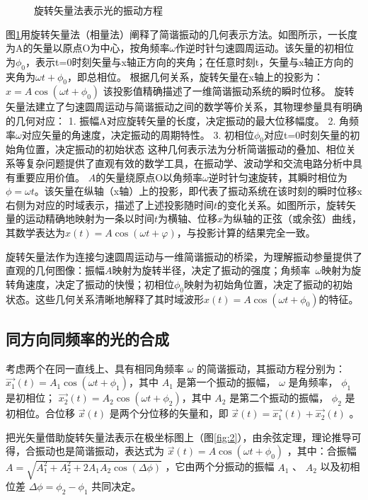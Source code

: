 \documentclass[withoutpreface,bwprint]{cumcmthesis} %
\begin{document}
\begin{appendices}
\begin{figure}[!h]
        \caption{旋转矢量法表示光的振动方程}
        \label{fig:1}
    \end{figure}

    图\ref{fig:1}用旋转矢量法（相量法）阐释了简谐振动的几何表示方法。如图所示，一长度为A的矢量以原点O为中心，按角频率$\omega$作逆时针匀速圆周运动。该矢量的初相位为$\phi_0$，表示t=0时刻矢量与x轴正方向的夹角；在任意时刻t，矢量与x轴正方向的夹角为$\omega t+\phi_0$，即总相位。
    根据几何关系，旋转矢量在x轴上的投影为： $x=A\cos(\omega t+\phi_0)$
    该投影值精确描述了一维简谐振动系统的瞬时位移。
    旋转矢量法建立了匀速圆周运动与简谐振动之间的数学等价关系，其物理参量具有明确的几何对应：
    1.	振幅A对应旋转矢量的长度，决定振动的最大位移幅度。
    2.	角频率$\omega$对应矢量的角速度，决定振动的周期特性。
    3.	初相位$\phi_0$对应t=0时刻矢量的初始角位置，决定振动的初始状态
    这种几何表示法为分析简谐振动的叠加、相位关系等复杂问题提供了直观有效的数学工具，在振动学、波动学和交流电路分析中具有重要应用价值。
    $A$的矢量绕原点O以角频率$\omega$逆时针匀速旋转，其瞬时相位为$\phi=\omega t$。该矢量在纵轴（x轴）上的投影，即代表了振动系统在该时刻的瞬时位移x右侧为对应的时域表示，描述了上述投影随时间$t$的变化关系。如图所示，旋转矢量的运动精确地映射为一条以时间$t$为横轴、位移$x$为纵轴的正弦（或余弦）曲线，其数学表达为$x(t)=A\cos(\omega t+\varphi)$，与投影计算的结果完全一致。

    旋转矢量法作为连接匀速圆周运动与一维简谐振动的桥梁，为理解振动参量提供了直观的几何图像：振幅$A$映射为旋转半径，决定了振动的强度；角频率 $\omega$映射为旋转角速度，决定了振动的快慢；初相位$\phi_0$映射为初始角位置，决定了振动的初始状态。这些几何关系清晰地解释了其时域波形$x(t)=A\cos(\omega t+\phi_0)$的特征。

    \subsection{同方向同频率的光的合成}
    考虑两个在同一直线上、具有相同角频率 $\omega$ 的简谐振动，其振动方程分别为：
    $ \overrightarrow{x_1}(t) = A_1 \cos(\omega t + \phi_{1})$，其中 $A_1$ 是第一个振动的振幅， $\omega$ 是角频率， $\phi_{1}$ 是初相位；
    $\overrightarrow{x_2}(t) = A_2 \cos(\omega t + \phi_{2})$，其中 $A_2$ 是第二个振动的振幅， $\phi_{2}$ 是初相位。合位移 $\overrightarrow{x}(t)$ 是两个分位移的矢量和，即 $\overrightarrow{x}(t) = \overrightarrow{x_1}(t) + \overrightarrow{x_2}(t)$ 。

    把光矢量借助旋转矢量法表示在极坐标图上（图\ref{fig:2}），由余弦定理，理论推导可得，合振动也是简谐振动，表达式为 $\overrightarrow{x}(t) = A \cos(\omega t + \phi_0)$ ，其中：合振幅 $A = \sqrt{A_1^2 + A_2^2 + 2 A_1 A_2 \cos(\Delta \phi)}$ ，它由两个分振动的振幅 $A_1$ 、 $A_2$ 以及初相位差 $\Delta \phi = \phi_{2} - \phi_{1}$ 共同决定。


\end{appendices}
\end{document}
